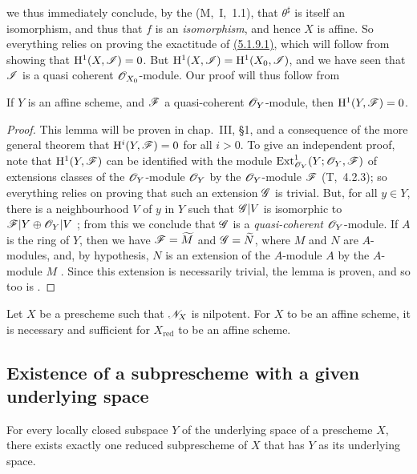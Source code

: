 we thus immediately conclude, by the  (M,~I,~1.1), that $\theta^\sharp$ is itself an isomorphism, and thus that $f$ is an \emph{isomorphism}, and hence $X$ is affine.
So everything relies on proving the exactitude of \hyperref[1.5.1.9]{(5.1.9.1)}, which will follow from showing that $\mathrm{H}^1(X,\mathscr{I})=0$.
But $\mathrm{H}^1(X,\mathscr{I})=\mathrm{H}^1(X_0,\mathscr{I})$, and we have seen that $\mathscr{I}$ is a quasi coherent $\mathscr{O}_{X_0}$-module.
Our proof will thus follow from
\begin{lem}[5.1.9.2]
\label{1.5.1.9.2}
If $Y$ is an affine scheme, and $\mathscr{F}$ a quasi-coherent $\mathscr{O}_Y$-module, then $\mathrm{H}^1(Y,\mathscr{F})=0$.
\end{lem}

\begin{proof}
\label{proof-1.5.1.9}
This lemma will be proven in chap.~III, §1, and a consequence of the more general theorem that $\mathrm{H}^i(Y,\mathscr{F})=0$ for all $i>0$.
To give an independent proof, note that $\mathrm{H}^1(Y,\mathscr{F})$ can be identified with the module ${\mathop{\mathrm{Ext}}\nolimits}_{\mathscr{O}_Y}^1(Y;\mathscr{O}_Y,\mathscr{F})$ of extensions classes of the $\mathscr{O}_Y$-module $\mathscr{O}_Y$ by the $\mathscr{O}_Y$-module $\mathscr{F}$ (T,~4.2.3);
so everything relies on proving that such an extension $\mathscr{G}$ is trivial.
But, for all $y\in Y$, there is a neighbourhood $V$ of $y$ in $Y$ such that $\mathscr{G}|V$ is isomorphic to $\mathscr{F}|Y\oplus\mathscr{O}_Y|V$ ;
from this we conclude that $\mathscr{G}$ is a \emph{quasi-coherent} $\mathscr{O}_Y$-module.
If $A$ is the ring of $Y$, then we have $\mathscr{F}=\widetilde{M}$ and $\mathscr{G}=\widetilde{N}$, where $M$ and $N$ are $A$-modules, and, by hypothesis, $N$ is an extension of the $A$-module $A$ by the $A$-module $M$ .
Since this extension is necessarily trivial, the lemma is proven, and so too is .
\end{proof}

\begin{cor}[5.1.10]
\label{1.5.1.10}
Let $X$ be a prescheme such that $\mathscr{N}_X$ is nilpotent.
For $X$ to be an affine scheme, it is necessary and sufficient for $X_\mathrm{red}$ to be an affine scheme.
\end{cor}

\subsection{Existence of a subprescheme with a given underlying space}
\label{subsection-existence-of-a-subprescheme-with-a-given-underlying-space}

\begin{prop}[5.2.1]
\label{1.5.2.1}
For every locally closed subspace $Y$ of the underlying space of a prescheme $X$, there exists exactly one reduced subprescheme of $X$ that has $Y$ as its underlying space.
\end{prop}

